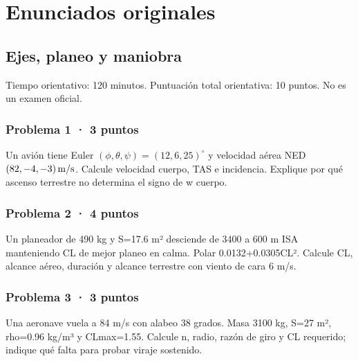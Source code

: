 \part{Enunciados originales}

\chapter{Ejes, planeo y maniobra}

Tiempo orientativo: 120 minutos. Puntuación total orientativa: 10 puntos. No es un examen oficial.

\section{Problema 1 · 3 puntos}

Un avión tiene Euler $(\phi,\theta,\psi)=(12,6,25)^\circ$ y velocidad aérea NED $(82,-4,-3)\,\mathrm{m/s}$. Calcule velocidad cuerpo, TAS e incidencia. Explique por qué ascenso terrestre no determina el signo de w cuerpo.


\section{Problema 2 · 4 puntos}

Un planeador de 490 kg y S=17.6 m² desciende de 3400 a 600 m ISA manteniendo CL de mejor planeo en calma. Polar 0.0132+0.0305CL². Calcule CL, alcance aéreo, duración y alcance terrestre con viento de cara 6 m/s.


\section{Problema 3 · 3 puntos}

Una aeronave vuela a 84 m/s con alabeo 38 grados. Masa 3100 kg, S=27 m², rho=0.96 kg/m³ y CLmax=1.55. Calcule n, radio, razón de giro y CL requerido; indique qué falta para probar viraje sostenido.


